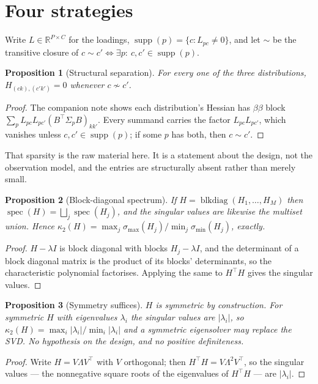 \documentclass[11pt,a4paper]{article}
\theoremstyle{plain}
\newtheorem{proposition}{Proposition}
\theoremstyle{definition}
\newcommand{\R}{\mathbb{R}}
\newcommand{\spec}{\operatorname{spec}}
\newcommand{\supp}{\operatorname{supp}}
\newcommand{\cond}{\kappa}
\newcommand{\blkdiag}{\operatorname{blkdiag}}
\begin{document}
\section{Four strategies}

Write $L \in \R^{P\times C}$ for the loadings, $\supp(p) = \{c : L_{pc}\neq 0\}$, and let $\sim$
be the transitive closure of $c \sim c' \iff \exists p:\ c,c'\in\supp(p)$. \begin{proposition}[Structural separation]\label{prop:separation}
For every one of the three distributions, $H_{(ck),(c'k')} = 0$ whenever $c \not\sim c'$.
\end{proposition}
\begin{proof}
The companion note shows each distribution's Hessian has $\beta\beta$ block
$\sum_p L_{pc}L_{pc'}(B^\top\Sigma_pB)_{kk'}$. Every summand carries the factor
$L_{pc}L_{pc'}$, which vanishes unless $c,c' \in \supp(p)$; if some $p$ has both, then
$c \sim c'$.
\end{proof}

That sparsity is the raw material here. It is a statement about the design, not the observation
model, and the entries are structurally absent rather than merely small.

\begin{proposition}[Block-diagonal spectrum]\label{prop:spectrum}
If $H = \blkdiag(H_1,\dots,H_M)$ then $\spec(H) = \bigsqcup_j \spec(H_j)$, and the singular
values are likewise the multiset union. Hence
$\cond_2(H) = \max_j \sigma_{\max}(H_j)\big/\min_j\sigma_{\min}(H_j)$, exactly.
\end{proposition}
\begin{proof}
$H - \lambda I$ is block diagonal with blocks $H_j - \lambda I$, and the determinant of a block
diagonal matrix is the product of its blocks' determinants, so the characteristic polynomial
factorises. Applying the same to $H^\top H$ gives the singular values.
\end{proof}

\begin{proposition}[Symmetry suffices]\label{prop:eigh}
$H$ is symmetric by construction. For symmetric $H$ with eigenvalues $\lambda_i$ the singular
values are $|\lambda_i|$, so $\cond_2(H) = \max_i|\lambda_i|/\min_i|\lambda_i|$ and a symmetric
eigensolver may replace the SVD. No hypothesis on the design, and no positive definiteness.
\end{proposition}
\begin{proof}
Write $H = V\Lambda V^\top$ with $V$ orthogonal; then $H^\top H = V\Lambda^2 V^\top$, so the
singular values --- the nonnegative square roots of the eigenvalues of $H^\top H$ --- are
$|\lambda_i|$.
\end{proof}
\end{document}
